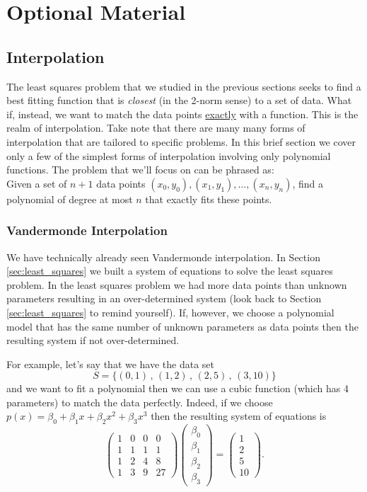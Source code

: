 \chapter{Optional Material}


\section{Interpolation}
The least squares problem that we studied in the previous sections seeks to find a best
fitting function that is {\it closest} (in the 2-norm sense) to a set of data.  What if,
instead, we want to match the data points \underline{exactly} with a function. This is the realm of
interpolation.  Take note that there are many many forms of interpolation that are
tailored to specific problems.  In this brief section we cover only a few of the simplest
forms of interpolation involving only polynomial functions.
The problem that we'll focus on can be phrased as:\\  Given a set of $n+1$ data points $(x_0, y_0), (x_1, y_1), \ldots,
(x_n,y_n)$, find a polynomial of degree at most $n$ that exactly fits these points.
\subsection{Vandermonde Interpolation}
We have technically already seen Vandermonde interpolation.  In Section
\ref{sec:least_squares} we built a system of equations to solve the least squares problem.
In the least squares problem we had more data points than unknown parameters resulting in
an over-determined system (look back to Section \ref{sec:least_squares} to remind
yourself).  If, however, we choose a polynomial model that has the same number of unknown
parameters as data points then the resulting system if not over-determined.

For example, let's say that we have the data set 
\[ S = \{ (0,1) \, , \, (1,2) \, , \, (2,5) \, , \, (3,10) \} \]
and we want to fit a polynomial then we can use a cubic function (which has 4 parameters)
to match the data perfectly.  Indeed, if we choose $p(x) = \beta_0 + \beta_1 x + \beta_2
x^2 + \beta_3 x^3$ then the resulting system of equations is
\[ \begin{pmatrix}  1 & 0 & 0 & 0 \\
                    1 & 1 & 1 & 1 \\
                    1 & 2 & 4 & 8 \\
                    1 & 3 & 9 & 27 \end{pmatrix} \begin{pmatrix} \beta_0 \\ \beta_1 \\
                    \beta_2 \\ \beta_3 \end{pmatrix} = \begin{pmatrix} 1 \\ 2 \\ 5 \\ 10
            \end{pmatrix}. \]

